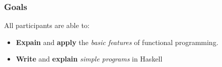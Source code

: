 
\subsubsection{Goals}
All participants are able to:
\begin{itemize}
    \item \textbf{Expain} and \textbf{apply} the \textit{basic features} of functional programming.
    \item \textbf{Write} and \textbf{explain} \textit{simple programs} in Haskell
\end{itemize}